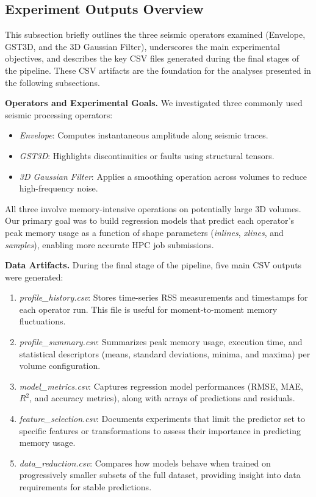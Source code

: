 \subsection{Experiment Outputs Overview}
\label{subsec:pmc-results-experiment-outputs-overview}

This subsection briefly outlines the three seismic operators examined (Envelope, \ac{GST3D}, and the 3D Gaussian Filter), underscores the main experimental objectives, and describes the key \ac{CSV} files generated during the final stages of the pipeline.
These \ac{CSV} artifacts are the foundation for the analyses presented in the following subsections.

\vspace{1em}
\noindent
\textbf{Operators and Experimental Goals.}
We investigated three commonly used seismic processing operators:
\begin{itemize}
    \item \emph{Envelope}: Computes instantaneous amplitude along seismic traces. 
    \item \emph{\ac{GST3D}}: Highlights discontinuities or faults using structural tensors.
    \item \emph{3D Gaussian Filter}: Applies a smoothing operation across volumes to reduce high-frequency noise.
\end{itemize}
All three involve memory-intensive operations on potentially large \ac{3D} volumes.
Our primary goal was to build regression models that predict each operator’s peak memory usage as a function of shape parameters (\textit{inlines}, \textit{xlines}, and \textit{samples}), enabling more accurate \ac{HPC} job submissions.

\vspace{1em}
\noindent
\textbf{Data Artifacts.}
During the final stage of the pipeline, five main \ac{CSV} outputs were generated:
\begin{enumerate}
    \item \emph{profile\_history.csv}: Stores time-series \ac{RSS} measurements and timestamps for each operator run. This file is useful for  moment-to-moment memory fluctuations.
    \item \emph{profile\_summary.csv}: Summarizes peak memory usage, execution time, and statistical descriptors (means, standard deviations, minima, and maxima) per volume configuration.
    \item \emph{model\_metrics.csv}: Captures regression model performances (\ac{RMSE}, \ac{MAE}, $R^2$, and accuracy metrics), along with arrays of predictions and residuals.
    \item \emph{feature\_selection.csv}: Documents experiments that limit the predictor set to specific features or transformations to assess their importance in predicting memory usage.
    \item \emph{data\_reduction.csv}: Compares how models behave when trained on progressively smaller subsets of the full dataset, providing insight into data requirements for stable predictions.
\end{enumerate}

